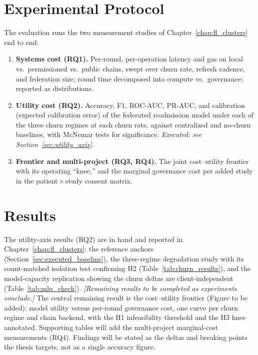 \documentclass[12pt]{report}
\begin{document}
\section{Experimental Protocol}
\label{sec:protocol}
The evaluation runs the two measurement studies of
Chapter~\ref{chap:fl_clusters} end to end:
\begin{enumerate}
  \item \textbf{Systems cost (RQ1).} Per-round, per-operation latency and gas on
  local vs.\ permissioned vs.\ public chains, swept over churn rate, refresh
  cadence, and federation size; round time decomposed into compute vs.\
  governance; reported as distributions.
  \item \textbf{Utility cost (RQ2).} Accuracy, F1, ROC-AUC, PR-AUC, and
  calibration (expected calibration error) of the federated readmission model
  under each of the
  three churn regimes at each churn rate, against centralized and no-churn
  baselines, with McNemar tests for significance. \emph{Executed: see
  Section~\ref{sec:utility_axis}.}
  \item \textbf{Frontier and multi-project (RQ3, RQ4).} The joint cost--utility
  frontier with its operating ``knee,'' and the marginal governance cost per
  added study in the patient\,$\times$\,study consent matrix.
\end{enumerate}

\section{Results}
\label{sec:integration_results}
The utility-axis results (RQ2) are in hand and reported in
Chapter~\ref{chap:fl_clusters}: the reference anchors
(Section~\ref{sec:executed_baseline}), the three-regime degradation study
with its count-matched isolation test confirming H2
(Table~\ref{tab:churn_results}), and the model-capacity replication showing the
churn deltas are client-independent (Table~\ref{tab:mlp_check}).
\emph{[Remaining results to be completed as experiments conclude.]} The central remaining result is the
cost--utility frontier (Figure to be added): model utility versus per-round
governance cost, one curve per churn regime and chain backend, with the H1
infeasibility threshold and the H3 knee annotated. Supporting tables will add
the multi-project marginal-cost
measurements (RQ4). Findings will be stated as the deltas and breaking points the
thesis targets, not as a single accuracy figure.

\end{document}
